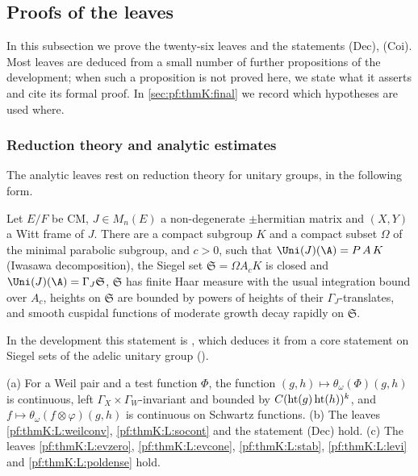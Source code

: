 \subsection{Proofs of the leaves}\label{sec:pf:thmK:leafproofs}

In this subsection we prove the twenty-six leaves and the statements \textup{(Dec)}, \textup{(Coi)}. Most leaves are
deduced from a small number of further propositions of the development; when such a proposition is not proved here, we
state what it asserts and cite its formal proof. In \cref{sec:pf:thmK:final} we record which hypotheses are used where.

\subsubsection{Reduction theory and analytic estimates}\label{sec:pf:thmK:est}
The analytic leaves rest on reduction theory for unitary groups, in the following form.

\begin{littheorem}\label{pf:thmK:siegel}
Let $E/F$ be CM, $J\in M_n(E)$ a non-degenerate $\pm$hermitian matrix and $(X,Y)$ a Witt frame of $J$. There are a
compact subgroup $K$ and a compact subset $\Omega$ of the minimal parabolic subgroup, and $c>0$, such that
$\Uni(J)(\A)=P\,A\,K$ (Iwasawa decomposition), the Siegel set $\mathfrak S=\Omega A_cK$ is closed and $\Uni(J)(\A)=\Gamma_J
\mathfrak S$, $\mathfrak S$ has finite Haar measure with the usual integration bound over $A_c$, heights on $\mathfrak S$
are bounded by powers of heights of their $\Gamma_J$-translates, and smooth cuspidal functions of moderate growth decay
rapidly on $\mathfrak S$.
\end{littheorem}

In the development this statement is , which deduces it from a core
statement on Siegel sets of the adelic unitary group ().

\begin{proposition}\label{pf:thmK:analytic}
\textup{(a)} For a Weil pair and a test function $\Phi$, the function $(g,h)\mapsto\theta_\omega(\Phi)(g,h)$ is
continuous, left $\Gamma_X\times\Gamma_W$-invariant and bounded by $C(\operatorname{ht}(g)\operatorname{ht}(h))^k$, and
$f\mapsto\theta_\omega(f\otimes\varphi)(g,h)$ is continuous on Schwartz functions. \textup{(b)} The leaves
\ref{pf:thmK:L:weilconv}, \ref{pf:thmK:L:socont} and the statement \textup{(Dec)} hold. \textup{(c)} The leaves
\ref{pf:thmK:L:evzero}, \ref{pf:thmK:L:evcone}, \ref{pf:thmK:L:stab}, \ref{pf:thmK:L:levi} and \ref{pf:thmK:L:poldense} hold.
\end{proposition}

